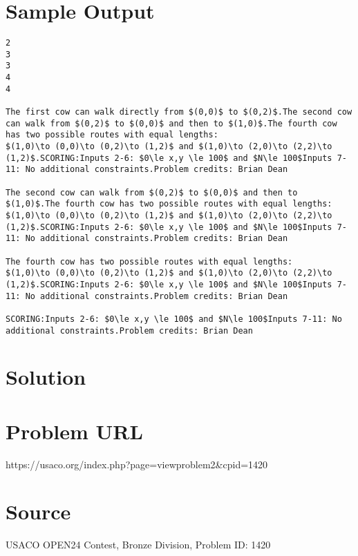 \documentclass[12pt]{article}
\begin{document}
\section*{Sample Output}
\begin{verbatim}
2
3
3
4
4

The first cow can walk directly from $(0,0)$ to $(0,2)$.The second cow can walk from $(0,2)$ to $(0,0)$ and then to $(1,0)$.The fourth cow has two possible routes with equal lengths:
$(1,0)\to (0,0)\to (0,2)\to (1,2)$ and $(1,0)\to (2,0)\to (2,2)\to (1,2)$.SCORING:Inputs 2-6: $0\le x,y \le 100$ and $N\le 100$Inputs 7-11: No additional constraints.Problem credits: Brian Dean

The second cow can walk from $(0,2)$ to $(0,0)$ and then to $(1,0)$.The fourth cow has two possible routes with equal lengths:
$(1,0)\to (0,0)\to (0,2)\to (1,2)$ and $(1,0)\to (2,0)\to (2,2)\to (1,2)$.SCORING:Inputs 2-6: $0\le x,y \le 100$ and $N\le 100$Inputs 7-11: No additional constraints.Problem credits: Brian Dean

The fourth cow has two possible routes with equal lengths:
$(1,0)\to (0,0)\to (0,2)\to (1,2)$ and $(1,0)\to (2,0)\to (2,2)\to (1,2)$.SCORING:Inputs 2-6: $0\le x,y \le 100$ and $N\le 100$Inputs 7-11: No additional constraints.Problem credits: Brian Dean

SCORING:Inputs 2-6: $0\le x,y \le 100$ and $N\le 100$Inputs 7-11: No additional constraints.Problem credits: Brian Dean
\end{verbatim}

\section*{Solution}


\section*{Problem URL}
https://usaco.org/index.php?page=viewproblem2&cpid=1420

\section*{Source}
USACO OPEN24 Contest, Bronze Division, Problem ID: 1420
\end{document}
